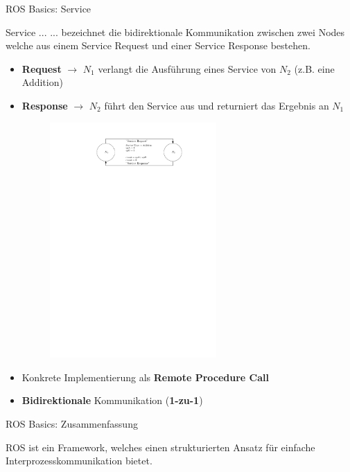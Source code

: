 \documentclass{beamer}
\begin{document}
\begin{frame}{ROS Basics: Service}
\begin{alertblock}{Service ...}
... bezeichnet die bidirektionale Kommunikation zwischen zwei Nodes welche aus einem Service Request und einer Service Response bestehen.
\end{alertblock}
\begin{itemize}
	\item \textbf{Request} $\rightarrow$ $N_1$ verlangt die Ausf\"uhrung eines Service von $N_2$ (z.B. eine Addition)
	\item \textbf{Response} $\rightarrow$ $N_2$ f\"uhrt den Service aus und returniert das Ergebnis an $N_1$
	\begin{figure}[H]
		\centering
		\includegraphics[width=0.6\textwidth]{./images/ros-service.pdf}
		\label{fig:ros_service}
	\end{figure}
	\item Konkrete Implementierung als \textbf{Remote Procedure Call}
	\item \textbf{Bidirektionale} Kommunikation (\textbf{1-zu-1})
\end{itemize}
\end{frame}
\begin{frame}{ROS Basics: Zusammenfassung}
\begin{center}
\begin{huge}
ROS ist ein Framework, welches einen strukturierten Ansatz f\"ur einfache Interprozesskommunikation bietet.
\end{huge}
\end{center}
\end{frame}
\end{document}
